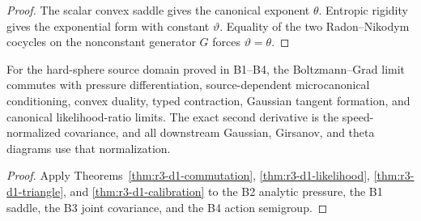 \begin{proof}
The scalar convex saddle gives the canonical exponent \(\theta\).  Entropic
rigidity gives the exponential form with constant \(\vartheta\).  Equality of
the two Radon--Nikodym cocycles on the nonconstant generator \(G\) forces
\(\vartheta=\theta\).
\end{proof}

\begin{theorem}
\label{thm:r3-d1-main}
For the hard-sphere source domain proved in B1--B4, the
Boltzmann--Grad limit commutes with pressure differentiation,
source-dependent microcanonical conditioning, convex duality, typed
contraction, Gaussian tangent formation, and canonical likelihood-ratio
limits.  The exact second derivative is the speed-normalized covariance, and
all downstream Gaussian, Girsanov, and theta diagrams use that normalization.
\end{theorem}

\begin{proof}
Apply Theorems~\ref{thm:r3-d1-commutation},
\ref{thm:r3-d1-likelihood}, \ref{thm:r3-d1-triangle}, and
\ref{thm:r3-d1-calibration} to the B2 analytic pressure, the B1 saddle, the B3
joint covariance, and the B4 action semigroup.
\end{proof}
